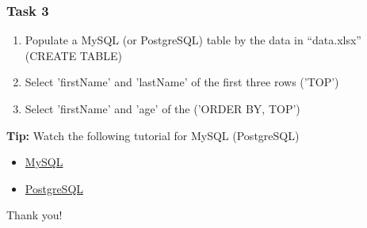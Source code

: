 \documentclass{beamer}
\begin{document}
\begin{frame}
    \frametitle{Task 3}
    \begin{enumerate}
        \item Populate a MySQL (or PostgreSQL) table by the data in “data.xlsx” (CREATE TABLE)
        \item Select 'firstName' and 'lastName' of the first three rows  ('TOP')
        \item Select 'firstName' and 'age' of the ('ORDER BY, TOP')
    \end{enumerate}
\vfill
\textbf{Tip:} Watch the following tutorial for MySQL (PostgreSQL)
\begin{itemize}
    \item \href{https://www.youtube.com/watch?v=e1LPfehYSgg&list=PLS1QulWo1RIY4auvfxAHS9m_fZJ2wxSse}{MySQL}
    \item \href{https://www.youtube.com/watch?v=xaWlS9HtWYw}{PostgreSQL}
\end{itemize}
\end{frame}

\begin{frame}
\Huge{\centerline{Thank you!}}
\end{frame}

\end{document}
